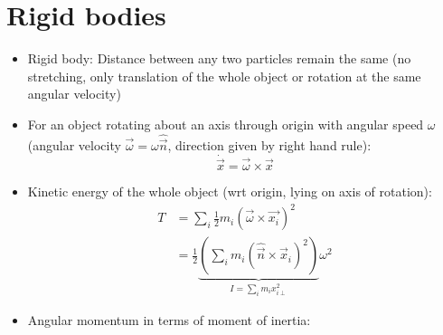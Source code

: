 \section{Rigid bodies}
\begin{itemize}
      \item Rigid body: Distance between any two particles remain the same (no stretching, only translation of the whole object or rotation at the same angular velocity)
      \item For an object rotating about an axis through origin with angular speed $\omega$ (angular velocity $\vec{\omega} = \omega \hat{\vec{n}}$, direction given by right hand rule):
            \[\dot{\vec{x}} = \vec{\omega} \times \vec{x}\]

      \item Kinetic energy of the whole object (wrt origin, lying on axis of rotation):
            \begin{align*}
                  T & = \sum_i \frac{1}{2} m_i (\vec{\omega} \times \vec{x_i})^2                                                                        \\
                    & = \frac{1}{2} \underbrace{\left( \sum_i m_i (\hat{\vec{n}} \times \vec{x}_{i})^2\right)}_{I = \sum_i m_i x_{i\perp}^2  } \omega^2
            \end{align*}

      \item Angular momentum in terms of moment of inertia:


\end{itemize}
